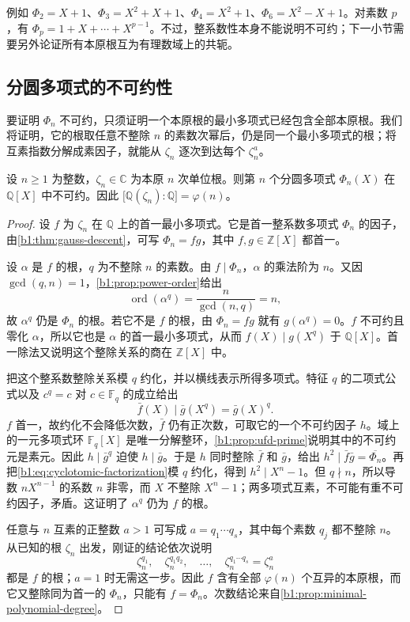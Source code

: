 \ProseParagraphBreak
例如 \(\Phi_2=X+1\)、\(\Phi_3=X^2+X+1\)、\(\Phi_4=X^2+1\)、\(\Phi_6=X^2-X+1\)。对素数 \(p\)，有 \(\Phi_p=1+X+\cdots+X^{p-1}\)。不过，整系数性本身不能说明不可约；下一小节需要另外论证所有本原根互为有理数域上的共轭。

\subsection{分圆多项式的不可约性}
\label{b1:subsec:2101:02}

要证明 \(\Phi_n\) 不可约，只须证明一个本原根的最小多项式已经包含全部本原根。我们将证明，它的根取任意不整除 \(n\) 的素数次幂后，仍是同一个最小多项式的根；将互素指数分解成素因子，就能从 \(\zeta_n\) 逐次到达每个 \(\zeta_n^a\)。

\begin{theorem}\label{b1:thm:cyclotomic-irreducible}
	设 \(n\geq1\) 为整数，\(\zeta_n\in\mathbb C\) 为本原 \(n\) 次单位根。则第 \(n\) 个分圆多项式 \(\Phi_n(X)\) 在 \(\mathbb Q[X]\) 中不可约。因此 \(\bigl[\mathbb Q(\zeta_n):\mathbb Q\bigr]=\varphi(n)\)。
\end{theorem}
\begin{proof}
	设 \(f\) 为 \(\zeta_n\) 在 \(\mathbb Q\) 上的首一最小多项式。它是首一整系数多项式 \(\Phi_n\) 的因子，由\cref{b1:thm:gauss-descent}，可写 \(\Phi_n=fg\)，其中 \(f,g\in\mathbb Z[X]\) 都首一。

	设 \(\alpha\) 是 \(f\) 的根，\(q\) 为不整除 \(n\) 的素数。由 \(f\mid\Phi_n\)，\(\alpha\) 的乘法阶为 \(n\)。又因 \(\gcd(q,n)=1\)，\cref{b1:prop:power-order}给出
	\[
		\operatorname{ord}(\alpha^q)=\frac{n}{\gcd(n,q)}=n,
	\]
	故 \(\alpha^q\) 仍是 \(\Phi_n\) 的根。若它不是 \(f\) 的根，由 \(\Phi_n=fg\) 就有 \(g(\alpha^q)=0\)。\(f\) 不可约且零化 \(\alpha\)，所以它也是 \(\alpha\) 的首一最小多项式，从而 \(f(X)\mid g(X^q)\) 于 \(\mathbb Q[X]\)。首一除法又说明这个整除关系的商在 \(\mathbb Z[X]\) 中。

	把这个整系数整除关系模 \(q\) 约化，并以横线表示所得多项式。特征 \(q\) 的二项式公式以及 \(c^q=c\) 对 \(c\in\mathbb F_q\) 的成立给出
	\[
		\bar f(X)\mid\bar g(X^q)=\bar g(X)^q.
	\]
	\(f\) 首一，故约化不会降低次数，\(\bar f\) 仍有正次数，可取它的一个不可约因子 \(h\)。域上的一元多项式环 \(\mathbb F_q[X]\) 是唯一分解整环，\cref{b1:prop:ufd-prime}说明其中的不可约元是素元。因此 \(h\mid\bar g^q\) 迫使 \(h\mid\bar g\)。于是 \(h\) 同时整除 \(\bar f\) 和 \(\bar g\)，给出 \(h^2\mid\bar f\bar g=\overline{\Phi_n}\)。再把\eqref{b1:eq:cyclotomic-factorization}模 \(q\) 约化，得到 \(h^2\mid X^n-1\)。但 \(q\nmid n\)，所以导数 \(nX^{n-1}\) 的系数 \(n\) 非零，而 \(X\) 不整除 \(X^n-1\)；两多项式互素，不可能有重不可约因子，矛盾。这证明了 \(\alpha^q\) 仍为 \(f\) 的根。

	任意与 \(n\) 互素的正整数 \(a>1\) 可写成 \(a=q_1\cdots q_s\)，其中每个素数 \(q_j\) 都不整除 \(n\)。从已知的根 \(\zeta_n\) 出发，刚证的结论依次说明
	\[
		\zeta_n^{q_1},\quad \zeta_n^{q_1q_2},\quad\ldots,\quad\zeta_n^{q_1\cdots q_s}=\zeta_n^a
	\]
	都是 \(f\) 的根；\(a=1\) 时无需这一步。因此 \(f\) 含有全部 \(\varphi(n)\) 个互异的本原根，而它又整除同为首一的 \(\Phi_n\)，只能有 \(f=\Phi_n\)。次数结论来自\cref{b1:prop:minimal-polynomial-degree}。
\end{proof}

